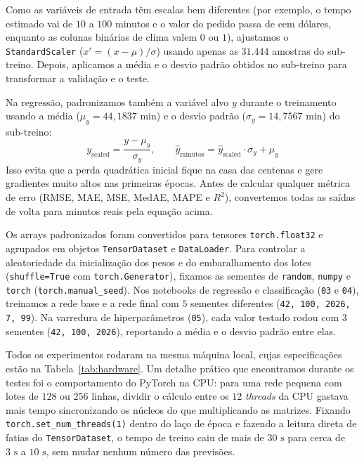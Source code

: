 \documentclass[12pt,a4paper]{article}
\begin{document}
Como as variáveis de entrada têm escalas bem diferentes (por exemplo, o tempo estimado vai de $10$ a $100$ minutos e o valor do pedido passa de cem dólares, enquanto as colunas binárias de clima valem $0$ ou $1$), ajustamos o \texttt{StandardScaler} ($x' = (x - \mu)/\sigma$) usando apenas as $31.444$ amostras do sub-treino. Depois, aplicamos a média e o desvio padrão obtidos no sub-treino para transformar a validação e o teste.

Na regressão, padronizamos também a variável alvo $y$ durante o treinamento usando a média ($\mu_y = 44{,}1837\text{ min}$) e o desvio padrão ($\sigma_y = 14{,}7567\text{ min}$) do sub-treino:
\begin{equation}
    y_{\text{scaled}} = \frac{y - \mu_y}{\sigma_y}, \qquad \hat{y}_{\text{minutos}} = \hat{y}_{\text{scaled}} \cdot \sigma_y + \mu_y
\end{equation}
Isso evita que a perda quadrática inicial fique na casa das centenas e gere gradientes muito altos nas primeiras épocas. Antes de calcular qualquer métrica de erro (RMSE, MAE, MSE, MedAE, MAPE e $R^2$), convertemos todas as saídas de volta para minutos reais pela equação acima.

Os arrays padronizados foram convertidos para tensores \texttt{torch.float32} e agrupados em objetos \texttt{TensorDataset} e \texttt{DataLoader}. Para controlar a aleatoriedade da inicialização dos pesos e do embaralhamento dos lotes (\texttt{shuffle=True} com \texttt{torch.Generator}), fixamos as sementes de \texttt{random}, \texttt{numpy} e \texttt{torch} (\texttt{torch.manual\_seed}). Nos notebooks de regressão e classificação (\texttt{03} e \texttt{04}), treinamos a rede base e a rede final com $5$ sementes diferentes (\texttt{42, 100, 2026, 7, 99}). Na varredura de hiperparâmetros (\texttt{05}), cada valor testado rodou com $3$ sementes (\texttt{42, 100, 2026}), reportando a média e o desvio padrão entre elas.

Todos os experimentos rodaram na mesma máquina local, cujas especificações estão na Tabela~\ref{tab:hardware}. Um detalhe prático que encontramos durante os testes foi o comportamento do PyTorch na CPU: para uma rede pequena com lotes de $128$ ou $256$ linhas, dividir o cálculo entre os $12$ \textit{threads} da CPU gastava mais tempo sincronizando os núcleos do que multiplicando as matrizes. Fixando \texttt{torch.set\_num\_threads(1)} dentro do laço de época e fazendo a leitura direta de fatias do \texttt{TensorDataset}, o tempo de treino caiu de mais de $30\text{ s}$ para cerca de $3\text{ s}$ a $10\text{ s}$, sem mudar nenhum número das previsões.
\end{document}
